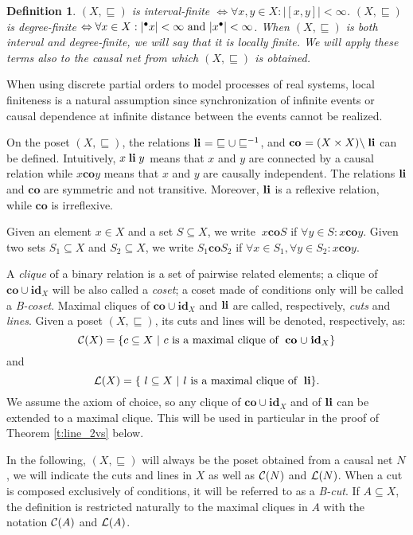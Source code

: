 \documentclass{eptcs}
\newcommand{\co}{\mathrel{\mathbf{co}}}
\newcommand{\id}{\mathrel{\mathbf{id}}}
\newtheorem{definition}{Definition}
\begin{document}
\begin{definition}\label{d:local_finiteness}
$(X, \sqsubseteq)$ is \emph{interval-finite}
$\Leftrightarrow \forall x,y \in X: |[x,y]|< \infty$.
$(X, \sqsubseteq)$ is \emph{degree-finite}
$\Leftrightarrow \forall x \in X:  
|\mbox{${}^\bullet{x}$}| < \infty \textrm{ and } |\mbox{${x}^\bullet$}| < \infty$. When $(X,
\sqsubseteq)$ is both interval and degree-finite, we will say that
it is \emph{locally finite}. We will apply these terms also to the causal
net from which $(X, \sqsubseteq)$ is obtained.\\
\end{definition}
When using discrete partial orders to model processes of
real systems, local finiteness is a natural
assumption since
synchronization of infinite events or
causal dependence at infinite distance between the events cannot be
realized.

On the poset $(X,\sqsubseteq)$, the relations
$\mathrel{\mathbf{li}}\ =\ \sqsubseteq \cup \sqsubseteq^{-1}$,
and $\co\ = (X \times X)\setminus \li$ can be
defined. Intuitively, $x \mathrel{\mathbf{li}} y$ means that $x$ and $y$ are connected
by a causal relation while $x \co y$ means that $x$ and $y$ are
causally independent.
The relations $\mathrel{\mathbf{li}}$ and $\co$ are symmetric and not transitive. 
Moreover, $\mathrel{\mathbf{li}}$ is a reflexive relation, while $\co$ is irreflexive.

Given an element $x \in X$ and a set $S \subseteq X$, 
we write $ \ x \co S$  if $\forall y \in S: x \co y$.
Given two sets $S_1 \subseteq X$ and $S_2 \subseteq X$, 
we write $S_1 \co S_2$ if
$\forall x \in S_1, \forall y \in S_2: x \co y$.

A \emph{clique} of a binary relation is a set of pairwise related elements;
a clique of $\co \cup \id_X$ will be also called a \emph{coset};
a coset made of conditions only will be called a \emph{B-coset}.
Maximal cliques of $\co \cup \id_X$ and $\mathrel{\mathbf{li}}$ are called, respectively,
\emph{cuts} and \emph{lines}. Given a poset $(X,\sqsubseteq)$, its
cuts and lines will be denoted, respectively, as:\\
\[
\cuts{X} =
     \{c \subseteq X \ | \ c \ \textrm{is a maximal clique of } \co
     \cup \id_X \}
\]
  and
\[
\mathcal{L}(X) =
     \{\ l \subseteq X \ | \ l \ \textrm{is a maximal clique of } \mathrel{\mathbf{li}}\}.
\]
We assume the axiom of choice, so any clique
of $\co \cup \id_X$ and of $\mathrel{\mathbf{li}}$ can be extended to a maximal
clique. This will be used in particular in the proof of Theorem
\ref{t:line_2vs} below.

In the following, $(X,\sqsubseteq)$ will always be the poset obtained
from a causal net $N$, we will indicate the cuts and lines in $X$
as well as $\mathcal{C}(N)$ and $\mathcal{L}(N)$. When a cut is
composed exclusively of conditions, it will be referred to as a
\emph{B-cut}. If $A\subseteq X$, the definition is restricted
naturally to the maximal cliques in $A$ with the notation $\mathcal{C}(A)$
and $\mathcal{L}(A)$.
\end{document}
